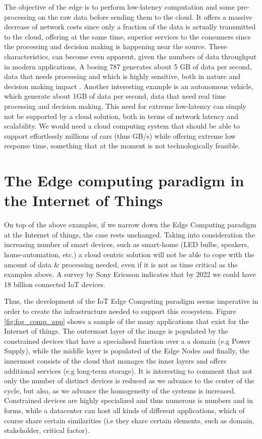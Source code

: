 The objective of the edge is to perform low-latency computation and some pre-processing on the raw data before sending them to the cloud. It offers a massive decrease of network costs since only a fraction of the data is actually transmitted to the cloud, offering at the same time, superior services to the consumers since the processing and decision making is happening near the source. These characteristics, can become even apparent, given the numbers of data throughput in modern applications. A boeing 787 generates about 5 GB of data per second, data that needs processing and which is highly sensitive, both in nature and decision making impact \cite{datafloq}. Another interesting example is an autonomous vehicle, which generate about 1GB of data \cite{finnegan2013}per second, data that need real time processing and decision making. This need for extreme low-latency can simply not be supported by a cloud solution, both in terms of network latency and scalability. We would need a cloud computing system that should be able to support effortlessly millions of cars (thus GB/s) while offering extreme low response time, something that at the moment is not technologically feasible.


\section{ The Edge computing paradigm in the Internet of Things}

On top of the above examples, if we narrow down the Edge Computing paradigm at the Internet of things, the case rests unchanged. Taking into consideration the increasing number of smart devices, such as smart-home (LED bulbs, speakers, home-automation, etc.) a cloud centric solution will not be able to cope with the amount of data \& processing needed, even if it is not as time critical as the examples above. A survey by Sony Ericsson indicates that by 2022 we could have 18 billion connected IoT devices\cite{ericsson}. 

Thus, the development of the IoT Edge Computing paradigm seems imperative in order to create the infrastructure needed to support this ecosystem. Figure \ref{fig:fog_comp_app} shows a sample of the many applications that exist for the Internet of things. The outermost layer of the image is populated by the constrained devices that have a specialised function over a a domain (e.g Power Supply), while the middle layer is populated of the Edge Nodes and finally, the innermost consists of the cloud that manages the inner layers and offers additional services (e.g long-term storage). It is interesting to comment that not only the number of distinct devices is reduced as we advance to the center of the cycle, but also, as we advance the homogeneity of the systems is increased. Constrained devices are highly specialized and thus numerous is numbers and in forms, while a datacenter can host all kinds of different applications, which of course share certain similarities (i.e they share certain elements, such as domain, stakeholder, critical factor).

